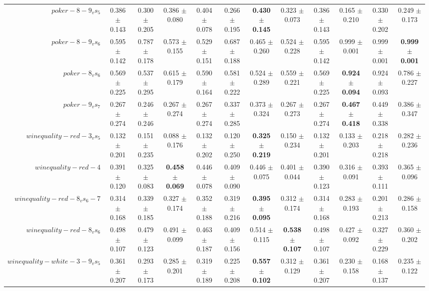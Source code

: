 \begin{table}[!ht]
{\begin{tabular}{r c c c c c c c c c c c}
$poker-8-9_vs_5$ & 0.386 $\pm$ 0.143 & 0.300 $\pm$ 0.205 & 0.386 $\pm$ 0.080 & 0.404 $\pm$ 0.078 & 0.266 $\pm$ 0.195 & \textbf{0.430 $\pm$ 0.145} & 0.323 $\pm$ 0.073 & 0.386 $\pm$ 0.143 & 0.165 $\pm$ 0.210 & 0.330 $\pm$ 0.202 & 0.249 $\pm$ 0.173 \\
$poker-8-9_vs_6$ & 0.595 $\pm$ 0.142 & 0.787 $\pm$ 0.178 & 0.573 $\pm$ 0.155 & 0.529 $\pm$ 0.151 & 0.687 $\pm$ 0.188 & 0.465 $\pm$ 0.260 & 0.524 $\pm$ 0.228 & 0.595 $\pm$ 0.142 & 0.999 $\pm$ 0.001 & 0.999 $\pm$ 0.001 & \textbf{0.999 $\pm$ 0.001} \\
$poker-8_vs_6$ & 0.569 $\pm$ 0.225 & 0.537 $\pm$ 0.295 & 0.615 $\pm$ 0.179 & 0.590 $\pm$ 0.164 & 0.581 $\pm$ 0.222 & 0.524 $\pm$ 0.289 & 0.559 $\pm$ 0.221 & 0.569 $\pm$ 0.225 & \textbf{0.924 $\pm$ 0.094} & 0.924 $\pm$ 0.093 & 0.786 $\pm$ 0.227 \\
$poker-9_vs_7$ & 0.267 $\pm$ 0.274 & 0.246 $\pm$ 0.246 & 0.267 $\pm$ 0.274 & 0.267 $\pm$ 0.274 & 0.337 $\pm$ 0.285 & 0.373 $\pm$ 0.324 & 0.267 $\pm$ 0.273 & 0.267 $\pm$ 0.274 & \textbf{0.467 $\pm$ 0.418} & 0.449 $\pm$ 0.338 & 0.386 $\pm$ 0.347 \\
$winequality-red-3_vs_5$ & 0.132 $\pm$ 0.201 & 0.151 $\pm$ 0.235 & 0.088 $\pm$ 0.176 & 0.132 $\pm$ 0.202 & 0.120 $\pm$ 0.250 & \textbf{0.325 $\pm$ 0.219} & 0.150 $\pm$ 0.234 & 0.132 $\pm$ 0.201 & 0.133 $\pm$ 0.203 & 0.218 $\pm$ 0.218 & 0.282 $\pm$ 0.236 \\
$winequality-red-4$ & 0.391 $\pm$ 0.120 & 0.325 $\pm$ 0.083 & \textbf{0.458 $\pm$ 0.069} & 0.446 $\pm$ 0.078 & 0.409 $\pm$ 0.090 & 0.446 $\pm$ 0.075 & 0.401 $\pm$ 0.044 & 0.390 $\pm$ 0.123 & 0.316 $\pm$ 0.091 & 0.393 $\pm$ 0.111 & 0.365 $\pm$ 0.096 \\
$winequality-red-8_vs_6-7$ & 0.314 $\pm$ 0.168 & 0.339 $\pm$ 0.185 & 0.327 $\pm$ 0.174 & 0.352 $\pm$ 0.188 & 0.319 $\pm$ 0.216 & \textbf{0.395 $\pm$ 0.095} & 0.312 $\pm$ 0.174 & 0.314 $\pm$ 0.168 & 0.283 $\pm$ 0.193 & 0.201 $\pm$ 0.213 & 0.286 $\pm$ 0.158 \\
$winequality-red-8_vs_6$ & 0.498 $\pm$ 0.107 & 0.479 $\pm$ 0.123 & 0.491 $\pm$ 0.099 & 0.463 $\pm$ 0.187 & 0.409 $\pm$ 0.156 & 0.514 $\pm$ 0.115 & \textbf{0.538 $\pm$ 0.107} & 0.498 $\pm$ 0.107 & 0.427 $\pm$ 0.092 & 0.327 $\pm$ 0.229 & 0.360 $\pm$ 0.202 \\
$winequality-white-3-9_vs_5$ & 0.361 $\pm$ 0.207 & 0.293 $\pm$ 0.173 & 0.285 $\pm$ 0.201 & 0.319 $\pm$ 0.189 & 0.225 $\pm$ 0.208 & \textbf{0.557 $\pm$ 0.102} & 0.312 $\pm$ 0.129 & 0.361 $\pm$ 0.207 & 0.230 $\pm$ 0.158 & 0.168 $\pm$ 0.137 & 0.235 $\pm$ 0.122 \\

\end{tabular}}
\end{table}
